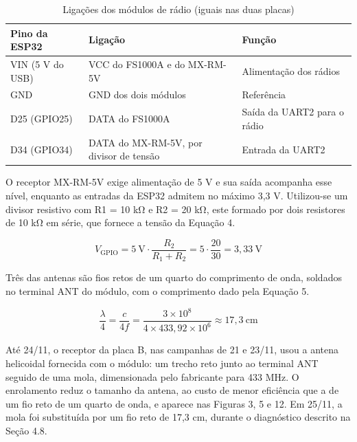 \documentclass[12pt, oneside, a4paper, sumario=tradicional, chapter=TITLE, brazilian]{abntex2}
\renewcommand{\arraystretch}{1.3}
\begin{document}
\begin{table}[H]
  \centering
  \caption{Ligações dos módulos de rádio (iguais nas duas placas)}
  \small\renewcommand{\arraystretch}{1.3}
  \begin{tabular}{|>{\raggedright\arraybackslash}m{3.30cm}|>{\centering\arraybackslash}m{6.04cm}|>{\centering\arraybackslash}m{5.31cm}|}
  \hline
  \rowcolor{gray!22}\textbf{Pino da ESP32} & \textbf{Ligação} & \textbf{Função} \\ \hline
  VIN (5 V do USB) & VCC do FS1000A e do MX-RM-5V & Alimentação dos rádios \\ \hline
  GND & GND dos dois módulos & Referência \\ \hline
  D25 (GPIO25) & DATA do FS1000A & Saída da UART2 para o rádio \\ \hline
  D34 (GPIO34) & DATA do MX-RM-5V, por divisor de tensão & Entrada da UART2 \\ \hline
  \end{tabular}
\end{table}

O receptor MX-RM-5V exige alimentação de 5 V e sua saída acompanha esse nível, enquanto as entradas da ESP32 admitem no máximo 3,3 V. Utilizou-se um divisor resistivo com R1 = 10 kΩ e R2 = 20 kΩ, este formado por dois resistores de 10 kΩ em série, que fornece a tensão da Equação 4.

\begin{equation}
  V_{\text{GPIO}} = 5\ \text{V} \cdot \frac{R_{2}}{R_{1} + R_{2}} = 5 \cdot \frac{20}{30} = 3{,}33\ \text{V}
\end{equation}

Três das antenas são fios retos de um quarto do comprimento de onda, soldados no terminal ANT do módulo, com o comprimento dado pela Equação 5.

\begin{equation}
  \frac{\lambda}{4} = \frac{c}{4f} = \frac{3 \times 10^{8}}{4 \times 433{,}92 \times 10^{6}} \approx 17{,}3\ \text{cm}
\end{equation}

Até 24/11, o receptor da placa B, nas campanhas de 21 e 23/11, usou a antena helicoidal fornecida com o módulo: um trecho reto junto ao terminal ANT seguido de uma mola, dimensionada pelo fabricante para 433 MHz. O enrolamento reduz o tamanho da antena, ao custo de menor eficiência que a de um fio reto de um quarto de onda, e aparece nas Figuras 3, 5 e 12. Em 25/11, a mola foi substituída por um fio reto de 17,3 cm, durante o diagnóstico descrito na Seção 4.8.
\end{document}
